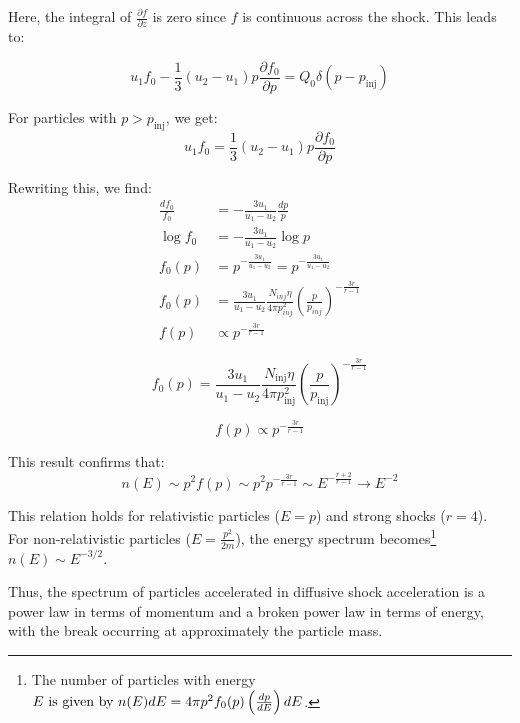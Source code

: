 Here, the integral of \( \frac{\partial f}{\partial z} \) is zero since \( f \) is continuous across the shock. This leads to:

\begin{equation}
u_1f_0 - \frac{1}{3}(u_2-u_1)p\frac{\partial f_0}{\partial p} = Q_0\delta(p-p_{\text{inj}})
\end{equation}

For particles with \( p > p_{\text{inj}} \), we get:
%
\begin{equation}
u_1f_0 = \frac{1}{3}(u_2-u_1)p\frac{\partial f_0}{\partial p}
\end{equation}

{\color{red}Rewriting this, we find:
%
\begin{equation}
\begin{aligned}
\frac{df_0}{f_0}&= -\frac{3u_1}{u_1-u_2}\frac{dp}{p}\\
\log f_0 &= -\frac{3u_1}{u_1-u_2} \log p\\
f_0(p)&= p^{-\frac{3u_1}{u_1-u_2}}= p^{-\frac{3u_1}{u_1-u_2}}\\
f_0(p)&=\frac{3u_1}{u_1-u_2}\frac{N_{inj}\eta}{4\pi p^2_{inj}}\left( \frac{p}{p_{inj}}\right)^{-\frac{3r}{r-1}}\\
f(p)&\propto p^{-\frac{3r}{r-1}}
\end{aligned}
\end{equation}

\begin{equation}
f_0(p) = \frac{3u_1}{u_1-u_2}\frac{N_{\text{inj}}\eta}{4\pi p^2_{\text{inj}}}\left( \frac{p}{p_{\text{inj}}}\right)^{-\frac{3r}{r-1}}
\end{equation}

\begin{equation}
f(p) \propto p^{-\frac{3r}{r-1}}
\end{equation}}

This result confirms that:
%
\begin{equation}
n(E) \sim p^2 f(p) \sim p^2 p^{-\frac{3r}{r-1}} \sim E^{-\frac{r+2}{r-1}} \rightarrow E^{-2}
\end{equation}

This relation holds for relativistic particles (\( E = p \)) and strong shocks (\( r = 4 \)). For non-relativistic particles (\( E = \frac{p^2}{2m} \)), the energy spectrum becomes\footnote{The number of particles with energy \( E$ is given by \( n(E)dE = 4\pi p^2 f_0(p) \left( \frac{dp}{dE} \right) dE \).}  \( n(E) \sim E^{-3/2} \).

Thus, the spectrum of particles accelerated in diffusive shock acceleration is a power law in terms of momentum and a broken power law in terms of energy, with the break occurring at approximately the particle mass.


